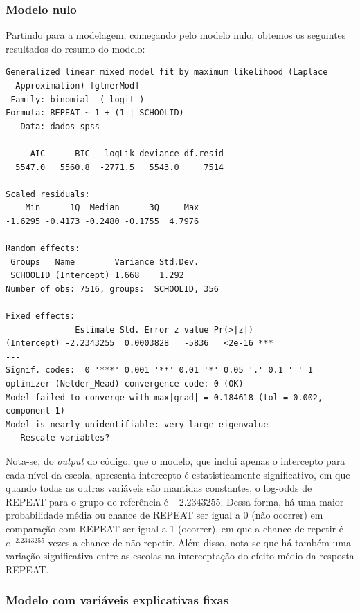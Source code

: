 \documentclass[
  letterpaper,
  DIV=11,
  numbers=noendperiod]{scrartcl}
\begin{document}
\hypertarget{modelo-nulo}{%
\subsubsection{Modelo nulo}\label{modelo-nulo}}

Partindo para a modelagem, começando pelo modelo nulo, obtemos os
seguintes resultados do resumo do modelo:

\begin{verbatim}
Generalized linear mixed model fit by maximum likelihood (Laplace
  Approximation) [glmerMod]
 Family: binomial  ( logit )
Formula: REPEAT ~ 1 + (1 | SCHOOLID)
   Data: dados_spss

     AIC      BIC   logLik deviance df.resid 
  5547.0   5560.8  -2771.5   5543.0     7514 

Scaled residuals: 
    Min      1Q  Median      3Q     Max 
-1.6295 -0.4173 -0.2480 -0.1755  4.7976 

Random effects:
 Groups   Name        Variance Std.Dev.
 SCHOOLID (Intercept) 1.668    1.292   
Number of obs: 7516, groups:  SCHOOLID, 356

Fixed effects:
              Estimate Std. Error z value Pr(>|z|)    
(Intercept) -2.2343255  0.0003828   -5836   <2e-16 ***
---
Signif. codes:  0 '***' 0.001 '**' 0.01 '*' 0.05 '.' 0.1 ' ' 1
optimizer (Nelder_Mead) convergence code: 0 (OK)
Model failed to converge with max|grad| = 0.184618 (tol = 0.002, component 1)
Model is nearly unidentifiable: very large eigenvalue
 - Rescale variables?
\end{verbatim}

Nota-se, do \textit{output} do código, que o modelo, que inclui apenas o
intercepto para cada nível da escola, apresenta intercepto é
estatisticamente significativo, em que quando todas as outras variáveis
são mantidas constantes, o log-odds de REPEAT para o grupo de referência
é \({-2.2343255}\). Dessa forma, há uma maior probabilidade média ou
chance de REPEAT ser igual a 0 (não ocorrer) em comparação com REPEAT
ser igual a 1 (ocorrer), em que a chance de repetir é \(e^{-2.2343255}\)
vezes a chance de não repetir. Além disso, nota-se que há também uma
variação significativa entre as escolas na interceptação do efeito médio
da resposta REPEAT.

\hypertarget{modelo-com-variuxe1veis-explicativas-fixas}{%
\subsubsection{Modelo com variáveis explicativas
fixas}\label{modelo-com-variuxe1veis-explicativas-fixas}}
\end{document}
